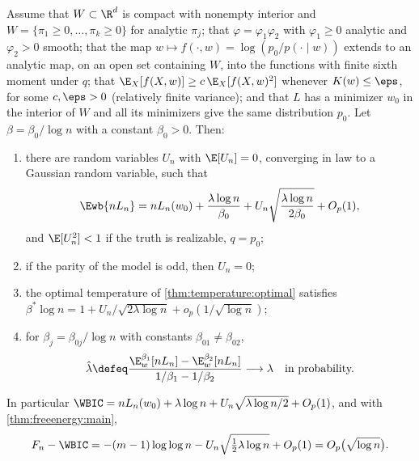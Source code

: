\begin{refsection}
\begin{theorem}\label{thm:temperature:wbic}
Assume that $W\subset\R^d$ is compact with nonempty interior and $W=\{\pi_1\ge0,\dots,\pi_k\ge0\}$ for analytic $\pi_j$; that $\varphi=\varphi_1\varphi_2$ with $\varphi_1\ge0$ analytic and $\varphi_2>0$ smooth; that the map $w\mapsto f(\cdot,w)=\log(p_0/p(\cdot\mid w))$ extends to an analytic map, on an open set containing $W$, into the functions with finite sixth moment under $q$; that $\E_X[f(X,w)]\ge c\,\E_X[f(X,w)^2]$ whenever $K(w)\le\eps$, for some $c,\eps>0$ (relatively finite variance); and that $L$ has a minimizer $w_0$ in the interior of $W$ and all its minimizers give the same distribution $p_0$. Let $\beta=\beta_0/\log n$ with a constant $\beta_0>0$. Then:
\begin{enumerate}
\item there are random variables $U_n$ with $\E[U_n]=0$, converging in law to a Gaussian random variable, such that
\[
\Ewb{nL_n}=nL_n(w_0)+\frac{\lambda\log n}{\beta_0}+U_n\sqrt{\frac{\lambda\log n}{2\beta_0}}+O_p(1),
\]
and $\E[U_n^2]<1$ if the truth is realizable, $q=p_0$;
\item if the parity of the model is odd, then $U_n=0$;
\item the optimal temperature of \cref{thm:temperature:optimal} satisfies $\beta^*\log n=1+U_n/\sqrt{2\lambda\log n}+o_p(1/\sqrt{\log n})$;
\item for $\beta_j=\beta_{0j}/\log n$ with constants $\beta_{01}\ne\beta_{02}$,
\[
\hat\lambda\defeq\frac{\E^{\beta_1}_w[nL_n]-\E^{\beta_2}_w[nL_n]}{1/\beta_1-1/\beta_2}\longrightarrow\lambda\quad\text{in probability.}
\]
\end{enumerate}
In particular $\WBIC=nL_n(w_0)+\lambda\log n+U_n\sqrt{\lambda\log n/2}+O_p(1)$, and with \cref{thm:freeenergy:main},
\begin{equation}\label{eq:temperature:gap}
F_n-\WBIC=-(m-1)\log\log n-U_n\sqrt{\tfrac12\lambda\log n}+O_p(1)=O_p\bigl(\sqrt{\log n}\bigr).
\end{equation}
\end{theorem}


\end{refsection}
